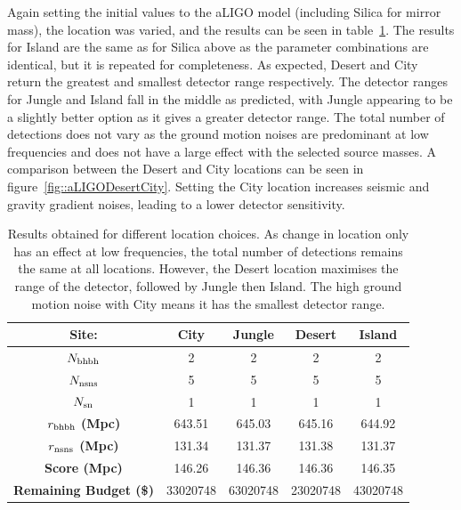 \documentclass{article}
\begin{document}
Again setting the initial values to the aLIGO model (including Silica
for mirror mass), the location was varied, and the results can be seen
in table~\ref{tab::locationtest}. The results for Island are the same
as for Silica above as the parameter combinations are identical, but
it is repeated for completeness. As expected, Desert and City return
the greatest and smallest detector range respectively. The detector
ranges for Jungle and Island fall in the middle as predicted, with
Jungle appearing to be a slightly better option as it gives a greater
detector range. The total number of detections does not vary as the
ground motion noises are predominant at low frequencies and does not
have a large effect with the selected source masses. A comparison
between the Desert and City locations can be seen in
figure~\ref{fig::aLIGODesertCity}. Setting the City location increases
seismic and gravity gradient noises, leading to a lower detector
sensitivity. 
    
    \begin{table}[h!]
    \centering
    \captionsetup{width=0.9\textwidth}
    \caption{Results obtained for different location choices. As
      change in location only has an effect at low frequencies, the
      total number of detections remains the same at all
      locations. However, the Desert location maximises the range of
      the detector, followed by Jungle then Island. The high ground
      motion noise with City means it has the smallest detector
      range.}
    \begin{tabular}{ |c|c|c|c|c| } 
     \hline
     \textbf{Site:} & \textbf{City}  & \textbf{Jungle}  & \textbf{Desert}  & \textbf{Island} \\     \hline
     \textbf{$N_{\rm bhbh}$}  & 2 & 2 & 2 & 2\\ 
     \hline
     \textbf{$N_{\rm nsns}$}  & 5 & 5 & 5 & 5\\ 
     \hline
     \textbf{$N_{\rm sn}$}  & 1 & 1  & 1 & 1 \\ 
     \hline
     \textbf{$r_{\rm bhbh}$ (Mpc)}  & 643.51 & 645.03 & 645.16  & 644.92 \\ 
     \hline
     \textbf{$r_{\rm nsns}$ (Mpc)}  & 131.34  & 131.37  & 131.38 & 131.37 \\ 
     \hline
    \textbf{Score (Mpc)}  & 146.26  & 146.36  & 146.36  & 146.35 \\ 
    \hline
    \textbf{Remaining Budget (\$)}  & 33020748  & 63020748  & 23020748 & 43020748 \\ 
    \hline
    \end{tabular}
    \label{tab::locationtest}
    \end{table}
    
\end{document}

